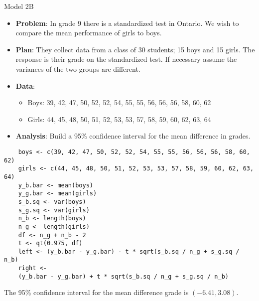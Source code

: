 \begin{Example}{Model 2B}{}
    \begin{itemize}
        \item \textbf{Problem}: In grade 9 there is a standardized test in Ontario. We wish to compare the mean performance of girls to boys.
        \item \textbf{Plan}: They collect data from a class of 30 students; 15 boys and 15 girls. The response is their grade on the standardized
              test. If necessary assume the variances of the two groups are different.
        \item \textbf{Data}:
              \begin{itemize}
                  \item Boys: 39, 42, 47, 50, 52, 52, 54, 55, 55, 56, 56, 56, 58, 60, 62
                  \item Girls: 44, 45, 48, 50, 51, 52, 53, 53, 57, 58, 59, 60, 62, 63, 64
              \end{itemize}
        \item \textbf{Analysis}: Build a 95\% confidence interval for the mean difference
              in grades.
    \end{itemize}
    \begin{verbatim}
    boys <- c(39, 42, 47, 50, 52, 52, 54, 55, 55, 56, 56, 56, 58, 60, 62)
    girls <- c(44, 45, 48, 50, 51, 52, 53, 53, 57, 58, 59, 60, 62, 63, 64)
    y_b.bar <- mean(boys)
    y_g.bar <- mean(girls)
    s_b.sq <- var(boys)
    s_g.sq <- var(girls)
    n_b <- length(boys)
    n_g <- length(girls)
    df <- n_g + n_b - 2
    t <- qt(0.975, df)
    left <- (y_b.bar - y_g.bar) - t * sqrt(s_b.sq / n_g + s_g.sq / n_b)
    right <-
    (y_b.bar - y_g.bar) + t * sqrt(s_b.sq / n_g + s_g.sq / n_b)
    \end{verbatim}
    The 95\% confidence interval for the mean difference grade is
    $ (-6.41,3.08) $.
\end{Example}
